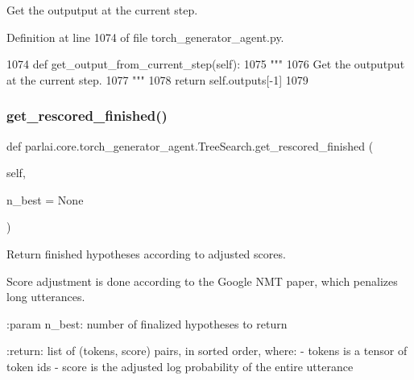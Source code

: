 \begin{DoxyVerb}Get the outputput at the current step.
\end{DoxyVerb}
 

Definition at line 1074 of file torch\+\_\+generator\+\_\+agent.\+py.


\begin{DoxyCode}
1074     \textcolor{keyword}{def }get\_output\_from\_current\_step(self):
1075         \textcolor{stringliteral}{"""}
1076 \textcolor{stringliteral}{        Get the outputput at the current step.}
1077 \textcolor{stringliteral}{        """}
1078         \textcolor{keywordflow}{return} self.outputs[-1]
1079 
\end{DoxyCode}
\mbox{\label{classparlai_1_1core_1_1torch__generator__agent_1_1TreeSearch_a4b70f85eec7d81b3a0e1afaea5b09332}} 
\subsubsection{\texorpdfstring{get\+\_\+rescored\+\_\+finished()}{get\_rescored\_finished()}}
{\footnotesize\ttfamily def parlai.\+core.\+torch\+\_\+generator\+\_\+agent.\+Tree\+Search.\+get\+\_\+rescored\+\_\+finished (\begin{DoxyParamCaption}\item[{}]{self,  }\item[{}]{n\+\_\+best = {\ttfamily None} }\end{DoxyParamCaption})}

\begin{DoxyVerb}Return finished hypotheses according to adjusted scores.

Score adjustment is done according to the Google NMT paper, which
penalizes long utterances.

:param n_best:
    number of finalized hypotheses to return

:return:
    list of (tokens, score) pairs, in sorted order, where:
      - tokens is a tensor of token ids
      - score is the adjusted log probability of the entire utterance
\end{DoxyVerb}
 

